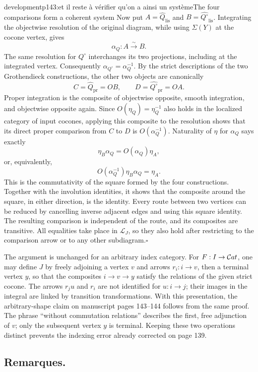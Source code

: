 \begin{dcomment}{development}{p143:et il reste à vérifier qu'on a ainsi un système}{The four comparisons form a coherent system}
Now put $A=\widehat Q_{\mathrm{lis}}$ and $B=\widehat{Q^\circ}_{\mathrm{lis}}$. Integrating the objectwise resolution of the original diagram, while using $\Sigma(Y)$ at the cocone vertex, gives
\[
 \alpha_Q:A\xrightarrow{\sim}B.
\]
The same resolution for $Q^\circ$ interchanges its two projections, including at the integrated vertex. Consequently $\alpha_{Q^\circ}=\alpha_Q^{-1}$. By the strict descriptions of the two Grothendieck constructions, the other two objects are canonically
\[
 C=\widehat Q_{\mathrm{pr}}=OB,
 \qquad D=\widehat{Q^\circ}_{\mathrm{pr}}=OA.
\]
Proper integration is the composite of objectwise opposite, smooth integration, and objectwise opposite again. Since $O(\eta_Q)=\eta_Q^{-1}$ also holds in the localized category of input cocones, applying this composite to the resolution shows that its direct proper comparison from $C$ to $D$ is $O(\alpha_Q^{-1})$. Naturality of $\eta$ for $\alpha_Q$ says exactly
\[
 \eta_B\alpha_Q=O(\alpha_Q)\eta_A,
\]
or, equivalently,
\[
 O(\alpha_Q^{-1})\eta_B\alpha_Q=\eta_A.
\]
This is the commutativity of the square formed by the four constructions. Together with the involution identities, it shows that the composite around the square, in either direction, is the identity. Every route between two vertices can be reduced by cancelling inverse adjacent edges and using this square identity. The resulting comparison is independent of the route, and its composites are transitive. All equalities take place in $\mathcal L_J$, so they also hold after restricting to the comparison arrow or to any other subdiagram.\hfill$\square$

The argument is unchanged for an arbitrary index category. For $F:I\to\mathcal{C}at$, one may define $J$ by freely adjoining a vertex $v$ and arrows $r_i:i\to v$, then a terminal vertex $y$, so that the composites $i\to v\to y$ satisfy the relations of the given strict cocone. The arrows $r_j u$ and $r_i$ are not identified for $u:i\to j$; their images in the integral are linked by transition transformations. With this presentation, the arbitrary-shape claim on manuscript pages 143--144 follows from the same proof. The phrase ``without commutation relations'' describes the first, free adjunction of $v$; only the subsequent vertex $y$ is terminal. Keeping these two operations distinct prevents the indexing error already corrected on page 139.
\end{dcomment}


\subsection*{Remarques.}

